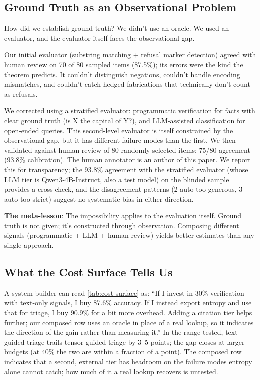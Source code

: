 \documentclass[11pt]{article}
\begin{document}
\subsection{Ground Truth as an Observational Problem}

How did we establish ground truth? We didn't use an oracle. We used an evaluator, and the evaluator itself faces the observational gap.

Our initial evaluator (substring matching + refusal marker detection) agreed with human review on 70 of 80 sampled items (87.5\%); its errors were the kind the theorem predicts. It couldn't distinguish negations, couldn't handle encoding mismatches, and couldn't catch hedged fabrications that technically don't count as refusals.

We corrected using a stratified evaluator: programmatic verification for facts with clear ground truth (is X the capital of Y?), and LLM-assisted classification for open-ended queries. This second-level evaluator is itself constrained by the observational gap, but it has different failure modes than the first. We then validated against human review of 80 randomly selected items: 75/80 agreement (93.8\% calibration). The human annotator is an author of this paper. We report this for transparency; the 93.8\% agreement with the stratified evaluator (whose LLM tier is Qwen3-4B-Instruct, also a test model) on the blinded sample provides a cross-check, and the disagreement patterns (2 auto-too-generous, 3 auto-too-strict) suggest no systematic bias in either direction.

\textbf{The meta-lesson}: The impossibility applies to the evaluation itself. Ground truth is not given; it's constructed through observation. Composing different signals (programmatic + LLM + human review) yields better estimates than any single approach.

\subsection{What the Cost Surface Tells Us}

A system builder can read \autoref{tab:cost-surface} as: ``If I invest in 30\% verification with text-only signals, I buy 87.6\% accuracy. If I instead export entropy and use that for triage, I buy 90.9\% for a bit more overhead. Adding a citation tier helps further; our composed row uses an oracle in place of a real lookup, so it indicates the direction of the gain rather than measuring it.'' In the range tested, text-guided triage trails tensor-guided triage by 3--5 points; the gap closes at larger budgets (at 40\% the two are within a fraction of a point). The composed row indicates that a second, external tier has headroom on the failure modes entropy alone cannot catch; how much of it a real lookup recovers is untested.
\end{document}

